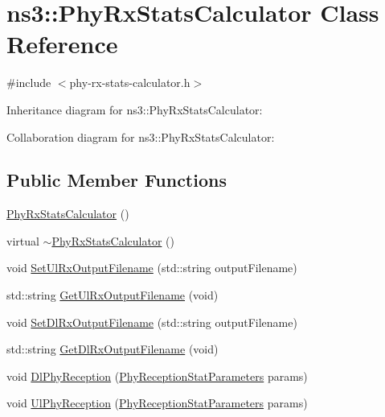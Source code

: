\hypertarget{classns3_1_1PhyRxStatsCalculator}{}\section{ns3\+:\+:Phy\+Rx\+Stats\+Calculator Class Reference}
\label{classns3_1_1PhyRxStatsCalculator}


{\ttfamily \#include $<$phy-\/rx-\/stats-\/calculator.\+h$>$}



Inheritance diagram for ns3\+:\+:Phy\+Rx\+Stats\+Calculator\+:


Collaboration diagram for ns3\+:\+:Phy\+Rx\+Stats\+Calculator\+:
\subsection*{Public Member Functions}
\begin{DoxyCompactItemize}
\item 
\hyperlink{classns3_1_1PhyRxStatsCalculator_a3da7fc0cdfd0c092cd313fc5ba1c89e6}{Phy\+Rx\+Stats\+Calculator} ()
\item 
virtual \hyperlink{classns3_1_1PhyRxStatsCalculator_a557de4e339865d7c5d852a6f1bf35f70}{$\sim$\+Phy\+Rx\+Stats\+Calculator} ()
\item 
void \hyperlink{classns3_1_1PhyRxStatsCalculator_af2a4dca3e43a5ad37acd53266b321893}{Set\+Ul\+Rx\+Output\+Filename} (std\+::string output\+Filename)
\item 
std\+::string \hyperlink{classns3_1_1PhyRxStatsCalculator_a1055ec6b6ec788fad2a17d8ed835f37b}{Get\+Ul\+Rx\+Output\+Filename} (void)
\item 
void \hyperlink{classns3_1_1PhyRxStatsCalculator_a9feb63009ac142ec65317b1028773e07}{Set\+Dl\+Rx\+Output\+Filename} (std\+::string output\+Filename)
\item 
std\+::string \hyperlink{classns3_1_1PhyRxStatsCalculator_a9b30d6bef15b40b7402eb559de719e2b}{Get\+Dl\+Rx\+Output\+Filename} (void)
\item 
void \hyperlink{classns3_1_1PhyRxStatsCalculator_a9c7d65b5514b0a4ba50ccae49f3f48e6}{Dl\+Phy\+Reception} (\hyperlink{structns3_1_1PhyReceptionStatParameters}{Phy\+Reception\+Stat\+Parameters} params)
\item 
void \hyperlink{classns3_1_1PhyRxStatsCalculator_af2777610cd765e1ceb91dd61c1dc91fa}{Ul\+Phy\+Reception} (\hyperlink{structns3_1_1PhyReceptionStatParameters}{Phy\+Reception\+Stat\+Parameters} params)
\end{DoxyCompactItemize}
